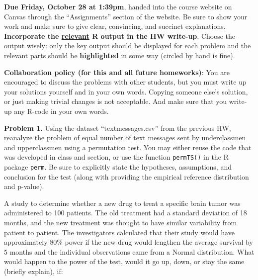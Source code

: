 \documentclass[11pt]{article}
\newcommand{\noin}{\noindent}
\begin{document}
 \medskip

\noindent \textbf{Due Friday, October 28 at 1:39pm}, handed into the course website on Canvas through the ``Assignments'' section of the website.  Be sure to show your work and make sure to give clear, convincing, and succinct explanations.  \textbf{Incorporate the \underline{relevant} R output in the HW write-up}. Choose the output wisely: only the key output should be displayed for each problem and the relevant parts should be \textbf{highlighted} in some way (circled by hand is fine).  

\vspace{0.1in}

\noin \textbf{Collaboration policy (for this and all future homeworks)}: You are encouraged to discuss the problems with other students, but you must write up your solutions yourself and in your own words. Copying someone else's solution, or just making trivial changes is not acceptable. And make sure that you write-up any R-code in your own words.

\vspace{0.2in}


\noindent \textbf{Problem 1.} Using the dataset ``textmessages.csv'' from the previous HW, reanalyze the problem of equal number of text messages sent by underclassmen and upperclassmen using a permutation test. You may either reuse the code that was developed in class and section, or use the function \texttt{permTS()} in the R package \texttt{perm}.  Be sure to explicitly state the hypotheses, assumptions, and conclusion for the test (along with providing the empirical reference distribution and p-value).


\vspace{0.3in}


 A study to determine whether a new drug to treat a specific brain tumor was administered to 100 patients.  The old treatment had a standard deviation of 18 months, and the new treatment was thought to have similar variability from patient to patient.  The investigators calculated that their study would have approximately 80\% power if the new drug would lengthen the average survival by 5 months and the individual observations came from a Normal distribution. What would happen to the power of the test, would it go up, down, or stay the same (briefly explain), if:

\vspace{0.1in}
\end{document}
